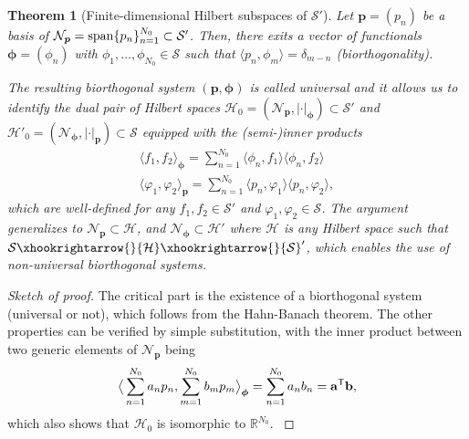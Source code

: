 \documentclass[11pt, english,english]{article}
\newtheorem{theorem}{Theorem}
\newcommand{\R}{ \mathbb{R}}
\def\V#1{{\boldsymbol{#1}}}         %
\def\Spc#1{{\mathcal{#1}}}  %
\def\M#1{{\bf{#1}}}  %
\def\Op#1{{\mathrm{#1}}}  %
\def\Identity{\mathrm{Id}} %
\newcommand{\embedC}{\xhookrightarrow{}}
\renewcommand{\[}{\begin{equation}}
\renewcommand{\]}[1]{\label{eq:#1}\end{equation}}
\newcommand{\Tr}{\mathsf{T}}
\begin{document}
\begin{theorem}[Finite-dimensional Hilbert subspaces of $\Spc S'$]
\label{Theo:FiniteDimHilbert}
Let $\V p=(p_n)$ be a basis of $\Spc N_{\V p}={\rm span}\{p_n\}_{n=1}^{N_0}\subset \Spc S'$. Then, there exits
 a vector of functionals $\V \phi=(\phi_n)$ with $\phi_1,\dots,\phi_{N_0}\in \Spc S$ such that
 $\langle p_n, \phi_m\rangle = \delta_{m-n}$ (biorthogonality).
 
The resulting biorthogonal system $(\V p, \V \phi)$ is called {\em universal} and it allows us to identify the dual pair of 
Hilbert spaces  $\Spc H_0=(\Spc N_{\V p},|\cdot|_{\V \phi}) \subset \Spc S'$ and
$\Spc H'_0=(\Spc N_{\V \phi},|\cdot|_{\V p}) \subset \Spc S$ equipped with the (semi-)inner
products
\begin{align}
\langle f_1,f_2\rangle_{\V \phi} = \sum_{n=1}^{N_0} \langle \phi_n,f_1 \rangle\langle \phi_n,f_2 \rangle\\ 
\langle \varphi_1,\varphi_2\rangle_{\V p} = \sum_{n=1}^{N_0} \langle p_n,\varphi_1 \rangle \langle p_n,\varphi_2 \rangle,
\end{align}
which are well-defined for any $f_1,f_2 \in \Spc S'$ and $\varphi_1,\varphi_2 \in \Spc S$.
The argument generalizes to $\Spc N_{\V p}\subset \Spc H$, and $\Spc N_{\V \phi}\subset \Spc H'$ where $\Spc H$ is any Hilbert space such that $\Spc S \embedC \Spc H \embedC \Spc S'$, which  enables the use of {\em non-universal} biorthogonal systems.
\end{theorem}
\begin{proof}[\small Sketch of proof]
{\small 
The critical part is the existence of a biorthogonal system (universal or not), which follows from the Hahn-Banach theorem. The other properties can be verified by simple substitution, with the inner product between two generic elements of $\Spc N_{\V p}$ being
\vspace*{-3ex}
\begin{align}
\big\langle \sum_{n=1}^{N_0}a_n p_n,\sum_{m=1}^{N_0}b_m p_m\big\rangle_{\V \phi}= \sum_{n=1}^{N_0}a_n b_n=\M a^\Tr\M b,
\end{align}
 which also shows that $\Spc H_0$ is isomorphic to 
$\R^{N_0}$.
} %
\end{proof}
\end{document}
